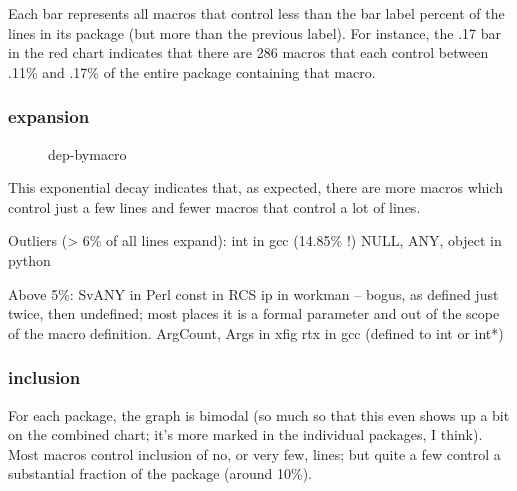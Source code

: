 \documentclass[10pt]{article}
\begin{document}
    Each bar represents all macros that control less than the bar label
      percent of the lines in its package (but more than the previous
      label).  For instance, the .17 bar in the red chart indicates that
      there are 286 macros that each control between .11\% and .17\% of the
      entire package containing that macro.

   \subsubsection{expansion}

\begin{figure}
\centerline{}
\bigskip
\centerline{}
\caption{dep-bymacro}
\label{fig:dep-bymacro}
\end{figure}

        This exponential decay indicates that, as expected, there are more
          macros which control just a few lines and fewer macros that
          control a lot of lines.

        Outliers (> 6\% of all lines expand):
          int in gcc (14.85\% !)
          NULL, ANY, object in python

        Above 5\%: 
          SvANY in Perl
          const in RCS
          ip in workman -- bogus, as defined just twice, then undefined;
                  most places it is a formal parameter and out of the scope
                  of the macro definition.
          ArgCount, Args in xfig
          rtx in gcc (defined to int or int*)

   \subsubsection{inclusion}

        For each package, the graph is bimodal (so much so that this even
          shows up a bit on the combined chart; it's more marked in the
          individual packages, I think).  Most macros control inclusion of
          no, or very few, lines; but quite a few control a substantial
          fraction of the package (around 10\%).
\end{document}
